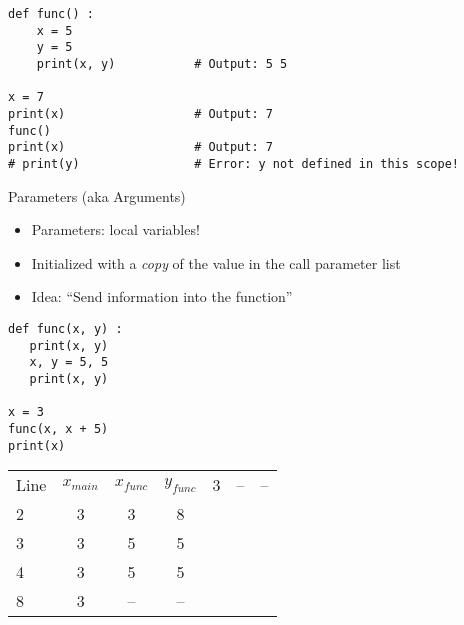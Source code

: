 
\begin{frame}[fragile]
%
\begin{codebox}
\begin{verbatim}
def func() :
    x = 5
    y = 5
    print(x, y)           # Output: 5 5

x = 7
print(x)                  # Output: 7
func()
print(x)                  # Output: 7
# print(y)                # Error: y not defined in this scope!
\end{verbatim}
\end{codebox}
%
\end{frame}


\begin{frame}[fragile]{Parameters (aka Arguments)}
%
\begin{itemize}
\item Parameters: local variables!
\item Initialized with a \emph{copy} of the value in the call parameter list
\item Idea: \enquote{Send information into the function}
\end{itemize}
%
\vspace{5pt}
\begin{tcbraster}[raster columns=2,
                  raster equal height,
                  nobeforeafter,
                  raster column skip=0.5cm]
\begin{codebox}
\begin{verbatim}
def func(x, y) :
   print(x, y)
   x, y = 5, 5
   print(x, y)

x = 3
func(x, x + 5)
print(x)   
\end{verbatim}
\end{codebox}
%
\begin{tcolorbox}[title=Evolution of Values]
\scriptsize
\begin{center}
\begin{tabular}{l|ccc}
Line & $x_{main}$ & $x_{func}$ & $y_{func}$  & 3 & -- & -- \\
2 & 3 &  3 &  8 \\
3 & 3 &  5 &  5 \\
4 & 3 &  5 &  5 \\
8 & 3 & -- & --
\end{tabular}
\end{center}
\end{tcolorbox}
\end{tcbraster}
%
\end{frame}

